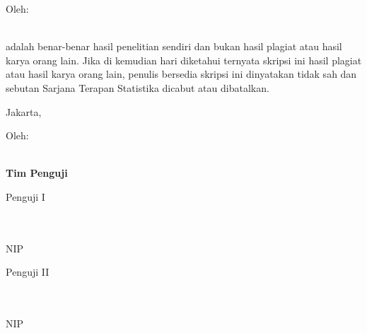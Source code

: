 \begin{titlepage}
\begin{center}
Oleh:\\[0.2cm]
\textbf{\MakeUppercase{\skNama}}\\
\textbf{\skNIM}
\end{center}
\vspace{1.2cm}

\noindent\justifying adalah benar-benar hasil penelitian sendiri dan bukan hasil plagiat
atau hasil karya orang lain. Jika di kemudian hari diketahui ternyata skripsi ini hasil
plagiat atau hasil karya orang lain, penulis bersedia skripsi ini dinyatakan tidak sah
dan sebutan Sarjana Terapan Statistika dicabut atau dibatalkan.
\vspace{1.5cm}

\begin{flushright}
\begin{minipage}{7cm}\centering
Jakarta, \skTglSidang\ \skTahun\\[2.2cm]
\textbf{\skNama}
\end{minipage}
\end{flushright}
\clearpage

\thispagestyle{empty}
\begin{center}{\bfseries\large \MakeUppercase{\skJudul}}\end{center}
\ifdefempty{\skSubjudul}{}{\begin{center}{\bfseries \skSubjudul}\end{center}}
\vspace{0.6cm}
\begin{center}Oleh:\\[0.2cm]\textbf{\MakeUppercase{\skNama}}\\ \textbf{\skNIM}\end{center}
\vspace{0.8cm}

\begingroup
\small
\newcommand{\ttdblok}[3]{%
  \begin{minipage}[t]{0.5\textwidth}\centering
  \begin{minipage}[t][2.2\baselineskip][t]{\linewidth}\centering #1\end{minipage}\\[2cm]
  \textbf{#2}\\
  NIP #3
  \end{minipage}%
}

\begin{center}\normalsize\textbf{Tim Penguji}\end{center}
\vspace{0.2cm}
\noindent
\ttdblok{Penguji I}{\skPengujiI}{\skNIPpengujiI}\hfill
\ttdblok{Penguji II}{\skPengujiII}{\skNIPpengujiII}
\vspace{1cm}


\end{titlepage}
